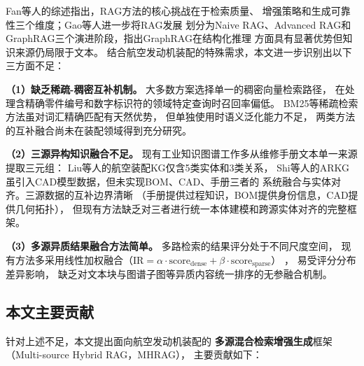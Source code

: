 Fan等人\cite{fan2024ragsurvey}的综述指出，RAG方法的核心挑战在于检索质量、
增强策略和生成可靠性三个维度；Gao等人\cite{gao2023ragsurvey}进一步将RAG发展
划分为Naive RAG、Advanced RAG和GraphRAG三个演进阶段，指出GraphRAG在结构化推理
方面具有显著优势但知识来源仍局限于文本。
结合航空发动机装配的特殊需求，本文进一步识别出以下三方面不足：

\textbf{（1）缺乏稀疏-稠密互补机制。}
大多数方案选择单一的稠密向量检索路径，
在处理含精确零件编号和数字标识符的领域特定查询时召回率偏低。
BM25等稀疏检索方法虽对词汇精确匹配有天然优势，
但单独使用时语义泛化能力不足，
两类方法的互补融合尚未在装配领域得到充分研究。

\textbf{（2）三源异构知识融合不足。}
现有工业知识图谱工作多从维修手册文本单一来源提取三元组：
Liu等人\cite{liu2023avkg}的航空装配KG仅含5类实体和3类关系，
Shi等人\cite{shi2022arkg}的ARKG虽引入CAD模型数据，但未实现BOM、CAD、手册三者的
系统融合与实体对齐。三源数据的互补边界清晰
（手册提供过程知识，BOM提供身份信息，CAD提供几何拓扑），
但现有方法缺乏对三者进行统一本体建模和跨源实体对齐的完整框架。

\textbf{（3）多源异质结果融合方法简单。}
多路检索的结果评分处于不同尺度空间，
现有方法多采用线性加权融合（$\text{IR} = \alpha \cdot \text{score}_{\text{dense}} + \beta \cdot \text{score}_{\text{sparse}}$）
\cite{shen2025hybridrag}，
易受评分分布差异影响，
缺乏对文本块与图谱子图等异质内容统一排序的无参融合机制。

\subsection{本文主要贡献}
\label{sec:contribution}

针对上述不足，本文提出面向航空发动机装配的
\textbf{多源混合检索增强生成}框架
（Multi-source Hybrid RAG，MHRAG），
主要贡献如下：

